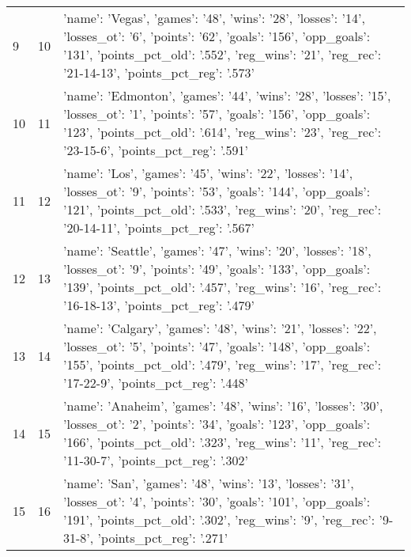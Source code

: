 \begin{tabular}{lrl}
9 & 10 & {'name': 'Vegas', 'games': '48', 'wins': '28', 'losses': '14', 'losses_ot': '6', 'points': '62', 'goals': '156', 'opp_goals': '131', 'points_pct_old': '.552', 'reg_wins': '21', 'reg_rec': '21-14-13', 'points_pct_reg': '.573'} \\
10 & 11 & {'name': 'Edmonton', 'games': '44', 'wins': '28', 'losses': '15', 'losses_ot': '1', 'points': '57', 'goals': '156', 'opp_goals': '123', 'points_pct_old': '.614', 'reg_wins': '23', 'reg_rec': '23-15-6', 'points_pct_reg': '.591'} \\
11 & 12 & {'name': 'Los', 'games': '45', 'wins': '22', 'losses': '14', 'losses_ot': '9', 'points': '53', 'goals': '144', 'opp_goals': '121', 'points_pct_old': '.533', 'reg_wins': '20', 'reg_rec': '20-14-11', 'points_pct_reg': '.567'} \\
12 & 13 & {'name': 'Seattle', 'games': '47', 'wins': '20', 'losses': '18', 'losses_ot': '9', 'points': '49', 'goals': '133', 'opp_goals': '139', 'points_pct_old': '.457', 'reg_wins': '16', 'reg_rec': '16-18-13', 'points_pct_reg': '.479'} \\
13 & 14 & {'name': 'Calgary', 'games': '48', 'wins': '21', 'losses': '22', 'losses_ot': '5', 'points': '47', 'goals': '148', 'opp_goals': '155', 'points_pct_old': '.479', 'reg_wins': '17', 'reg_rec': '17-22-9', 'points_pct_reg': '.448'} \\
14 & 15 & {'name': 'Anaheim', 'games': '48', 'wins': '16', 'losses': '30', 'losses_ot': '2', 'points': '34', 'goals': '123', 'opp_goals': '166', 'points_pct_old': '.323', 'reg_wins': '11', 'reg_rec': '11-30-7', 'points_pct_reg': '.302'} \\
15 & 16 & {'name': 'San', 'games': '48', 'wins': '13', 'losses': '31', 'losses_ot': '4', 'points': '30', 'goals': '101', 'opp_goals': '191', 'points_pct_old': '.302', 'reg_wins': '9', 'reg_rec': '9-31-8', 'points_pct_reg': '.271'} \\
\end{tabular}


